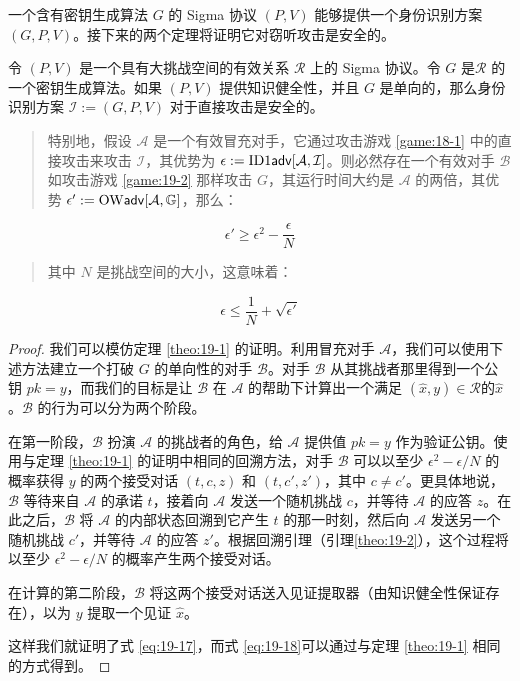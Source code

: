 一个含有密钥生成算法 $G$ 的 Sigma 协议 $(P,V)$ 能够提供一个身份识别方案 $(G,P,V)$。接下来的两个定理将证明它对窃听攻击是安全的。

\begin{theorem}
令 $(P,V)$ 是一个具有大挑战空间的有效关系 $\mathcal{R}$ 上的 Sigma 协议。令 $G$ 是$\mathcal{R}$ 的一个密钥生成算法。如果 $(P,V)$ 提供知识健全性，并且 $G$ 是单向的，那么身份识别方案 $\mathcal{I}:=(G,P,V)$ 对于直接攻击是安全的。

\begin{quote}
特别地，假设 $\mathcal{A}$ 是一个有效冒充对手，它通过攻击游戏 \ref{game:18-1} 中的直接攻击来攻击 $\mathcal{I}$，其优势为 $\epsilon:=\rm{ID1\mathsf{adv}}[\mathcal{A},\mathcal{I}]$。则必然存在一个有效对手 $\mathcal{B}$如攻击游戏 \ref{game:19-2} 那样攻击 $G$，其运行时间大约是 $\mathcal{A}$ 的两倍，其优势 $\epsilon':={\rm OW\mathsf{adv}}[\mathcal{A},\mathbb{G}]$，那么：
\end{quote}
\begin{equation}\label{eq:19-17}
\epsilon'\geq \epsilon^2-\frac{\epsilon}{N}
\end{equation}
\begin{quote}
其中 $N$ 是挑战空间的大小，这意味着：
\end{quote}
\begin{equation}\label{eq:19-18}
\epsilon\leq\frac{1}{N}+\sqrt{\epsilon'}
\end{equation}
\end{theorem}

\begin{proof}
我们可以模仿定理 \ref{theo:19-1} 的证明。利用冒充对手 $\mathcal{A}$，我们可以使用下述方法建立一个打破 $G$ 的单向性的对手 $\mathcal{B}$。对手 $\mathcal{B}$ 从其挑战者那里得到一个公钥 $pk = y$，而我们的目标是让 $\mathcal{B}$ 在 $\mathcal{A}$ 的帮助下计算出一个满足 $(\hat x,y)\in\mathcal{R}$的$\hat x$。$\mathcal{B}$ 的行为可以分为两个阶段。

在第一阶段，$\mathcal{B}$ 扮演 $\mathcal{A}$ 的挑战者的角色，给 $\mathcal{A}$ 提供值 $pk=y$ 作为验证公钥。使用与定理 \ref{theo:19-1} 的证明中相同的回溯方法，对手 $\mathcal{B}$ 可以以至少 $\epsilon^2-{\epsilon}/{N}$ 的概率获得 $y$ 的两个接受对话 $(t,c,z)$ 和 $(t,c',z')$，其中 $c\neq c'$。更具体地说，$\mathcal{B}$ 等待来自 $\mathcal{A}$ 的承诺 $t$，接着向 $\mathcal{A}$ 发送一个随机挑战 $c$，并等待 $\mathcal{A}$ 的应答 $z$。在此之后，$\mathcal{B}$ 将 $\mathcal{A}$ 的内部状态回溯到它产生 $t$ 的那一时刻，然后向 $\mathcal{A}$ 发送另一个随机挑战 $c'$，并等待 $\mathcal{A}$ 的应答 $z'$。根据回溯引理（引理\ref{theo:19-2}），这个过程将以至少 $\epsilon^2-{\epsilon}/{N}$ 的概率产生两个接受对话。

在计算的第二阶段，$\mathcal{B}$ 将这两个接受对话送入见证提取器（由知识健全性保证存在），以为 $y$ 提取一个见证 $\hat x$。

这样我们就证明了式 \ref{eq:19-17}，而式 \ref{eq:19-18}可以通过与定理 \ref{theo:19-1} 相同的方式得到。
\end{proof}

